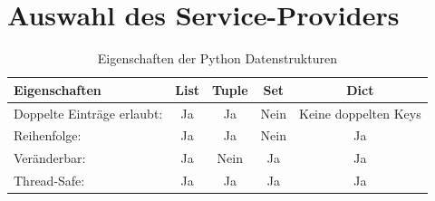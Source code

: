 \documentclass[fontsize=12pt,paper=a4,open=any,parskip=half,
  twoside=false,toc=listof,toc=bibliography,fleqn,leqno,
  captions=nooneline,captions=tableabove,british]{scrbook}
\begin{document}
\section{Auswahl des Service-Providers}
\begin{table}[htbp]
\caption{Eigenschaften der Python Datenstrukturen \autocite{listuple}}
\label{python-data-table}
\centering
  \begin{tabular}{l  c  c  c c} 
\toprule
    Eigenschaften & List & Tuple & Set & Dict\\ 
\midrule  
    	Doppelte Einträge erlaubt:   			& Ja  	&  Ja  		& Nein 	& Keine doppelten Keys\\
    	Reihenfolge:   						& Ja 	&  Ja 		& Nein 	& Ja\\ 
	Veränderbar:   						& Ja	&  Nein 	& Ja 		& Ja\\ 
	Thread-Safe:   						& Ja 	& Ja 	& Ja 		& Ja\\ 
  \end{tabular}

\end{table}
\end{document}
